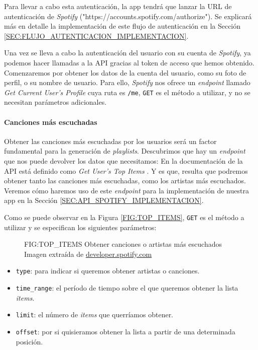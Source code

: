Para llevar a cabo esta autenticación, la app tendrá que lanzar la URL de autenticación de \textit{Spotify}
("https://accounts.spotify.com/authorize"). Se explicará más en detalle la implementación de este flujo de autenticación
en la Sección \ref{SEC:FLUJO_AUTENTICACION_IMPLEMENTACION}.

Una vez se lleva a cabo la autenticación del usuario con su cuenta de \textit{Spotify}, ya podemos hacer llamadas a la API
gracias al token de acceso que hemos obtenido. Comenzaremos por obtener los datos de la cuenta del usuario, como su foto de perfil, o su
nombre de usuario. Para ello, \textit{Spotify} nos ofrece un \textit{endpoint} llamado \textit{Get Current User's Profile} \cite{current_user_profile} cuya 
ruta es \texttt{/me}, \texttt{GET} es el método a utilizar, y no se necesitan parámetros adicionales.

\paragraph{Canciones más escuchadas\label{subsec:canciones_mas_escuchadas}}

Obtener las canciones más escuchadas por los usuarios será un factor fundamental para la generación de \textit{playlists}. Descubrimos que hay un 
\textit{endpoint} que nos puede devolver los datos que necesitamos: En la documentación de la API \cite{spotify_api} está definido como 
\textit{Get User's Top Items} \cite{top_items}. Y es que, resulta que podremos obtener tanto las canciones más escuchadas, como los artistas más escuchados. 
Veremos cómo haremos uso de este \textit{endpoint} para la implementación de nuestra app en la Sección \ref{SEC:API_SPOTIFY_IMPLEMENTACION}. 

Como se puede observar en la Figura \ref{FIG:TOP_ITEMS}, \texttt{GET} es el método a utilizar y se especifican los siguientes parámetros:

\begin{figure}[Obtener canciones o artistas más escuchados]{FIG:TOP_ITEMS}
  {Obtener canciones o artistas más escuchados \\
  {\scriptsize Imagen extraída de \href{https://developer.spotify.com/documentation/web-api/reference/get-users-top-artists-and-tracks}{developer.spotify.com}}}
\end{figure}

\begin{itemize}
  \item \texttt{type}: para indicar si queremos obtener artistas o canciones.
  \item \texttt{time\_range}: el período de tiempo sobre el que queremos obtener la lista \textit{items}.
  \item \texttt{limit}: el número de \textit{items} que querríamos obtener.
  \item \texttt{offset}: por si quisieramos obtener la lista a partir de una determinada posición.
\end{itemize}


